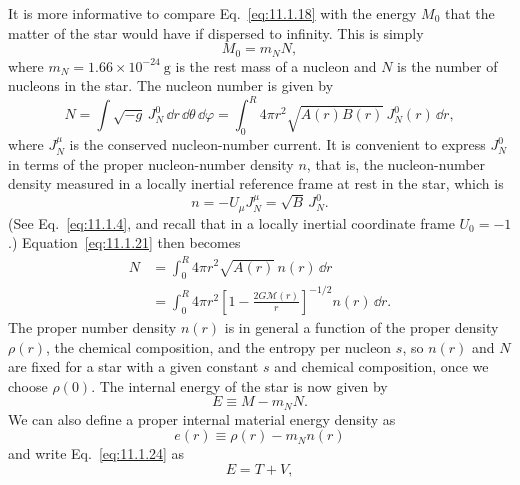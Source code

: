 It is more informative to compare Eq.~\eqref{eq:11.1.18} with the energy
\(M_0\) that the matter of the star would have if dispersed to infinity. This
is simply
\begin{equation}
  M_0=m_NN,
  \tag{11.1.20}\label{eq:11.1.20}
\end{equation}
where \(m_N=1.66\times10^{-24}\ \mathrm{g}\) is the rest mass of a nucleon and
\(N\) is the number of nucleons in the star. The nucleon number is given by
\begin{equation}
  N
  =
  \int\sqrt{-g}\,J_N^0\,\dd r\,\dd\theta\,\dd\varphi
  =
  \int_0^R4\pi r^2\sqrt{A(r)B(r)}\,J_N^0(r)\,\dd r,
  \tag{11.1.21}\label{eq:11.1.21}
\end{equation}
where \(J_N^\mu\) is the conserved nucleon-number current. It is convenient
to express \(J_N^0\) in terms of the proper nucleon-number density \(n\), that
is, the nucleon-number density measured in a locally inertial reference frame
at rest in the star, which is
\begin{equation}
  n=-U_\mu J_N^\mu=\sqrt{B}\,J_N^0.
  \tag{11.1.22}\label{eq:11.1.22}
\end{equation}
(See Eq.~\eqref{eq:11.1.4}, and recall that in a locally inertial coordinate
frame \(U_0=-1\).) Equation~\eqref{eq:11.1.21} then becomes
\begin{equation}
  \begin{split}
  N
  &=
  \int_0^R4\pi r^2\sqrt{A(r)}\,n(r)\,\dd r\\
  &=
  \int_0^R4\pi r^2
  \left[1-\frac{2G\mathcal{M}(r)}r\right]^{-1/2}
  n(r)\,\dd r.
  \end{split}
  \tag{11.1.23}\label{eq:11.1.23}
\end{equation}
The proper number density \(n(r)\) is in general a function of the proper
density \(\rho(r)\), the chemical composition, and the entropy per nucleon
\(s\), so \(n(r)\) and \(N\) are fixed for a star with a given constant \(s\)
and chemical composition, once we choose \(\rho(0)\). The internal energy of
the star is now given by
\begin{equation}
  E\equiv M-m_NN.
  \tag{11.1.24}\label{eq:11.1.24}
\end{equation}
We can also define a proper internal material energy density as
\begin{equation}
  e(r)\equiv\rho(r)-m_Nn(r)
  \tag{11.1.25}\label{eq:11.1.25}
\end{equation}
and write Eq.~\eqref{eq:11.1.24} as
\begin{equation}
  E=T+V,
  \tag{11.1.26}\label{eq:11.1.26}
\end{equation}
